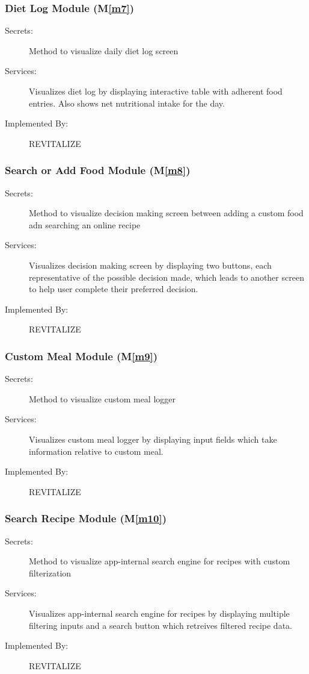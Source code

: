 \documentclass[12pt, titlepage]{article}
\newcommand{\mref}[1]{M\ref{#1}}
\begin{document}
\subsubsection{Diet Log Module (\mref{m7})}
\begin{description}
	\item[Secrets:]Method to visualize daily diet log screen
	\item[Services:]Visualizes diet log by displaying interactive table with adherent food entries. Also shows net nutritional intake for the day.
	\item[Implemented By:] REVITALIZE
\end{description}

\subsubsection{Search or Add Food Module (\mref{m8})}
\begin{description}
	\item[Secrets:]Method to visualize decision making screen between adding a custom food adn searching an online recipe
	\item[Services:]Visualizes decision making screen by displaying two buttons, each representative of the possible decision made, which leads to another screen to help user complete their preferred decision.
	\item[Implemented By:] REVITALIZE
\end{description}

\subsubsection{Custom Meal Module (\mref{m9})}
\begin{description}
	\item[Secrets:]Method to visualize custom meal logger
	\item[Services:]Visualizes custom meal logger by displaying input fields which take information relative to custom meal.
	\item[Implemented By:] REVITALIZE
\end{description}

\subsubsection{Search Recipe Module (\mref{m10})}
\begin{description}
	\item[Secrets:]Method to visualize app-internal search engine for recipes with custom filterization
	\item[Services:]Visualizes app-internal search engine for recipes by displaying multiple filtering inputs and a search button which retreives filtered recipe data.
	\item[Implemented By:] REVITALIZE
\end{description}
\end{document}
